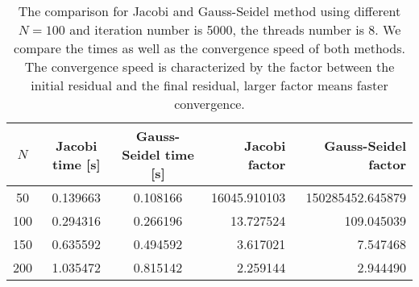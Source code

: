 \documentclass[10pt,a4paper]{article}
\theoremstyle{dotlessP}
\begin{document}
\begin{table}[tbhp]
	\label{tab:L2D-N}
	\caption{The comparison for Jacobi and Gauss-Seidel method using different $N=100$ and iteration number is 5000, the threads number is 8. We compare the times as well as the convergence speed of both methods. The convergence speed is characterized by the factor between the initial residual and the final residual, larger factor means faster convergence.}
	\centering
	\begin{tabular}{c|c c|r r}
		\hline 
		$N$ & Jacobi time [s]  &  Gauss-Seidel time [s] &  Jacobi factor &  Gauss-Seidel factor \\ 
		\hline 
		50 &  0.139663 & 0.108166 & 16045.910103 & 150285452.645879\\
		100 & 0.294316 & 0.266196 &  13.727524 & 109.045039 \\
		150 & 0.635592 & 0.494592 & 3.617021 &  7.547468\\
		200 &  1.035472 &   0.815142 & 2.259144 &  2.944490 \\
		\hline 
	\end{tabular} 
\end{table}
\end{document}

